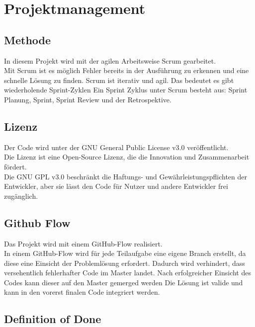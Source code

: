 \chapter{Projektmanagement}\label{ch:projektmanagement}

\section{Methode}\label{sec:methode}

In diesem Projekt wird mit der agilen Arbeitsweise Scrum gearbeitet.\\
Mit Scrum ist es möglich Fehler bereits in der Ausführung zu erkennen und eine schnelle Lösung zu finden.
Scrum ist iterativ und agil. Das bedeutet es gibt wiederholende Sprint-Zyklen
Ein Sprint Zyklus unter Scrum besteht aus: Sprint Planung, Sprint, Sprint Review und der Retrospektive.

\section{Lizenz}\label{sec:lizenz}

Der Code wird unter der GNU General Public License v3.0 veröffentlicht.\\
Die Lizenz ist eine Open-Source Lizenz, die die Innovation und Zusammenarbeit fördert.\\
Die GNU GPL v3.0 beschränkt die Haftungs- und Gewährleistungspflichten der Entwickler, aber sie lässt den Code für Nutzer und andere Entwickler frei zugänglich.

\section{Github Flow}\label{sec:github-flow}

Das Projekt wird mit einem GitHub-Flow realisiert.\\
In einem GitHub-Flow wird für jede Teilaufgabe eine eigene Branch erstellt, da diese eine Einsicht der Problemlösung erfordert.
Dadurch wird verhindert, dass versehentlich fehlerhafter Code im Master landet. Nach erfolgreicher Einsicht des Codes kann dieser auf den Master gemerged werden \dah{} Die Lösung ist valide und kann in den vorerst finalen Code integriert werden.



\section{Definition of Done}\label{sec:dod}

